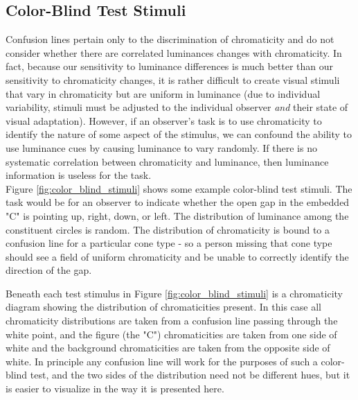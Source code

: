 \documentclass[twocolumn]{article}
\newif\ifinvert
\begin{document}
\subsection{Color-Blind Test Stimuli}
Confusion lines pertain only to the discrimination of chromaticity and do not consider whether there are correlated luminances changes with chromaticity.  In fact, because our sensitivity to luminance differences is much better than our sensitivity to chromaticity changes, it is rather difficult to create visual stimuli that vary in chromaticity but are uniform in luminance (due to individual variability, stimuli must be adjusted to the individual observer \textit{and} their state of visual adaptation).  However, if an observer's task is to use chromaticity to identify the nature of some aspect of the stimulus, we can confound the ability to use luminance cues by causing luminance to vary randomly.  If there is no systematic correlation between chromaticity and luminance, then luminance information is useless for the task.\\

Figure \ref{fig:color_blind_stimuli} shows some example color-blind test stimuli.  The task would be for an observer to indicate whether the open gap in the embedded "C" is pointing up, right, down, or left.  The distribution of luminance among the constituent circles is random.  The distribution of chromaticity is bound to a confusion line for a particular cone type - so a person missing that cone type should see a field of uniform chromaticity and be unable to correctly identify the direction of the gap.\\
\begin{figure*}[h]
    \ifinvert
        
    \else
        
    \fi
    \caption{Example color-blind test stimuli for (from left-to-right) missing long-, medium-, or short-wavelength sensitive cones (protanope, deuteranope, and tritanope, respectively).  The object is to indicate the direction of the gap in the embedded "C" shape.  Below each stimulus is a chromaticity diagram showing the distribution of chromaticities in the stimulus (black fuzzy lines crossing the white point).  IMAGE LINK, CODE LINK}\label{fig:color_blind_stimuli}
\end{figure*}

Beneath each test stimulus in Figure \ref{fig:color_blind_stimuli} is a chromaticity diagram showing the distribution of chromaticities present.  In this case all chromaticity distributions are taken from a confusion line passing through the white point, and the figure (the "C") chromaticities are taken from one side of white and the background chromaticities are taken from the opposite side of white.  In principle any confusion line will work for the purposes of such a color-blind test, and the two sides of the distribution need not be different hues, but it is easier to visualize in the way it is presented here.\\
\end{document}
